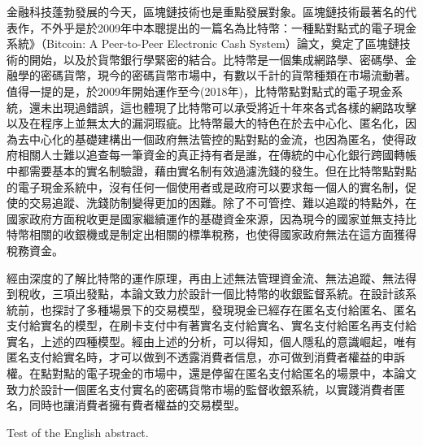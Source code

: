 
\begin{cabstract}
	金融科技蓬勃發展的今天，區塊鏈技術也是重點發展對象。區塊鏈技術最著名的代表作，不外乎是於2009年中本聰提出的一篇名為比特幣：一種點對點式的電子現金系統》（Bitcoin: A Peer-to-Peer Electronic Cash System）論文\parencite{bitcoinpaper}，奠定了區塊鏈技術的開始，以及於貨幣銀行學緊密的結合。比特幣是一個集成網路學、密碼學、金融學的密碼貨幣，現今的密碼貨幣市場中，有數以千計的貨幣種類在市場流動著。值得一提的是，於2009年開始運作至今(2018年)，比特幣點對點式的電子現金系統，還未出現過錯誤，這也體現了比特幣可以承受將近十年來各式各樣的網路攻擊以及在程序上並無太大的漏洞瑕疵。比特幣最大的特色在於去中心化、匿名化，因為去中心化的基礎建構出一個政府無法管控的點對點的金流，也因為匿名，使得政府相關人士難以追查每一筆資金的真正持有者是誰，在傳統的中心化銀行跨國轉帳中都需要基本的實名制驗證，藉由實名制有效過濾洗錢的發生。但在比特幣點對點的電子現金系統中，沒有任何一個使用者或是政府可以要求每一個人的實名制，促使的交易追蹤、洗錢防制變得更加的困難。除了不可管控、難以追蹤的特點外，在國家政府方面稅收更是國家繼續運作的基礎資金來源，因為現今的國家並無支持比特幣相關的收銀機或是制定出相關的標準稅務，也使得國家政府無法在這方面獲得稅務資金。

	經由深度的了解比特幣的運作原理，再由上述無法管理資金流、無法追蹤、無法得到稅收，三項出發點，本論文致力於設計一個比特幣的收銀監督系統。在設計該系統前，也探討了多種場景下的交易模型，發現現金已經存在匿名支付給匿名、匿名支付給實名的模型，在刷卡支付中有著實名支付給實名、實名支付給匿名再支付給實名，上述的四種模型。經由上述的分析，可以得知，個人隱私的意識崛起，唯有匿名支付給實名時，才可以做到不透露消費者信息，亦可做到消費者權益的申訴權。在點對點的電子現金的市場中，還是停留在匿名支付給匿名的場景中，本論文致力於設計一個匿名支付實名的密碼貨幣市場的監督收銀系統，以實踐消費者匿名，同時也讓消費者擁有費者權益的交易模型。
\end{cabstract}

\begin{eabstract}
	Test of the English abstract.
\end{eabstract}

